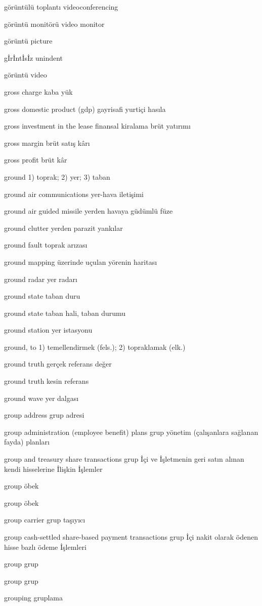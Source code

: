 \documentclass[12pt,fleqn]{article}\usepackage{../../common}
\begin{document}
görüntülü toplantı videoconferencing

görüntü monitörü video monitor

görüntü picture

gİrİntİsİz unindent

görüntü video

gross charge kaba yük

gross domestic product (gdp) gayrisafi yurtiçi hasıla 

gross investment in the lease finansal kiralama brüt yatırımı

gross margin brüt satış kârı

gross profit brüt kâr

ground 1) toprak; 2) yer; 3) taban

ground air communications yer-hava iletişimi

ground air guided missile yerden havaya güdümlü füze

ground clutter yerden parazit yankılar

ground fault toprak arızası

ground mapping üzerinde uçulan yörenin haritası

ground radar yer radarı

ground state taban duru

ground state taban hali, taban durumu

ground station yer istasyonu

ground, to 1) temellendirmek (fels.); 2) topraklamak (elk.)

ground truth gerçek referans değer

ground truth kesin referans

ground wave yer dalgası

group address grup adresi

group administration (employee benefit) plans grup yönetim (çalışanlara sağlanan fayda) planları

group and treasury share transactions grup İçi ve İşletmenin geri satın alınan kendi hisselerine İlişkin İşlemler

group öbek

group öbek

group carrier grup taşıyıcı

group cash-settled share-based payment transactions grup İçi nakit olarak ödenen hisse bazlı ödeme İşlemleri

group grup

group grup

grouping gruplama
\end{document}
